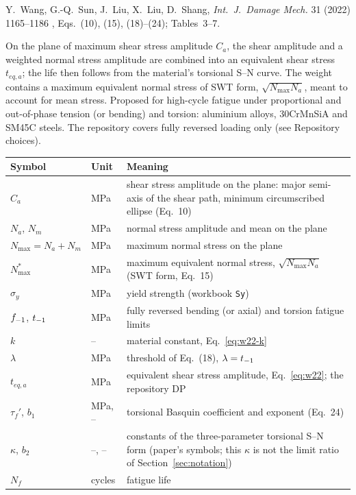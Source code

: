 \label{sheet:WANG2022}

 Y.~Wang, G.-Q.~Sun, J.~Liu, X.~Liu, D.~Shang, \emph{Int.\ J.\ Damage Mech.} 31 (2022)
1165--1186 \cite{wang2022}, Eqs.~(10), (15), (18)--(24); Tables~3--7.

 On the plane of maximum shear stress amplitude $C_a$, the shear amplitude and a
weighted normal stress amplitude are combined into an equivalent shear stress $t_{eq,a}$; the life
then follows from the material's torsional S--N curve. The weight contains a maximum equivalent normal
stress of SWT form, $\sqrt{N_{\max}N_a}$, meant to account for mean stress. Proposed for high-cycle
fatigue under proportional and out-of-phase tension (or bending) and torsion: aluminium alloys,
30CrMnSiA and SM45C steels. The repository covers fully reversed loading only (see Repository
choices).

\begin{center}\small
\begin{tabular}{@{}llp{100mm}@{}}
\toprule
Symbol & Unit & Meaning\\\midrule
$C_a$ & MPa & shear stress amplitude on the plane: major semi-axis of the shear path, minimum circumscribed ellipse (Eq.~10)\\
$N_a$, $N_m$ & MPa & normal stress amplitude and mean on the plane\\
$N_{\max}=N_a+N_m$ & MPa & maximum normal stress on the plane\\
$N^*_{\max}$ & MPa & maximum equivalent normal stress, $\sqrt{N_{\max}N_a}$ (SWT form, Eq.~15)\\
$\sigma_y$ & MPa & yield strength (workbook \texttt{Sy})\\
$f_{-1}$, $t_{-1}$ & MPa & fully reversed bending (or axial) and torsion fatigue limits\\
$k$ & -- & material constant, Eq.~\eqref{eq:w22-k}\\
$\lambda$ & MPa & threshold of Eq.~(18), $\lambda=t_{-1}$\\
$t_{eq,a}$ & MPa & equivalent shear stress amplitude, Eq.~\eqref{eq:w22}; the repository DP\\
$\tau_f'$, $b_1$ & MPa, -- & torsional Basquin coefficient and exponent (Eq.~24)\\
$\kappa$, $b_2$ & --, -- & constants of the three-parameter torsional S--N form (paper's symbols; this $\kappa$ is not the limit ratio of Section~\ref{sec:notation})\\
$N_f$ & cycles & fatigue life\\
\bottomrule
\end{tabular}
\end{center}


